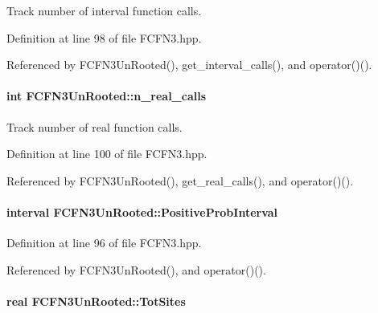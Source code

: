 \-Track number of interval function calls. 



\-Definition at line 98 of file \-F\-C\-F\-N3.\-hpp.



\-Referenced by \-F\-C\-F\-N3\-Un\-Rooted(), get\-\_\-interval\-\_\-calls(), and operator()().

\hypertarget{classFCFN3UnRooted_a69e7833eae34928dfa2c7506238df7ad}{
\paragraph[{n\-\_\-real\-\_\-calls}]{\setlength{\rightskip}{0pt plus 5cm}int {\bf \-F\-C\-F\-N3\-Un\-Rooted\-::n\-\_\-real\-\_\-calls}}}\label{classFCFN3UnRooted_a69e7833eae34928dfa2c7506238df7ad}


\-Track number of real function calls. 



\-Definition at line 100 of file \-F\-C\-F\-N3.\-hpp.



\-Referenced by \-F\-C\-F\-N3\-Un\-Rooted(), get\-\_\-real\-\_\-calls(), and operator()().

\hypertarget{classFCFN3UnRooted_a9afbe62a91bedfa9cde81086b4e5a0de}{
\paragraph[{\-Positive\-Prob\-Interval}]{\setlength{\rightskip}{0pt plus 5cm}interval {\bf \-F\-C\-F\-N3\-Un\-Rooted\-::\-Positive\-Prob\-Interval}}}\label{classFCFN3UnRooted_a9afbe62a91bedfa9cde81086b4e5a0de}


\-Definition at line 96 of file \-F\-C\-F\-N3.\-hpp.



\-Referenced by \-F\-C\-F\-N3\-Un\-Rooted(), and operator()().

\hypertarget{classFCFN3UnRooted_a4492c09788dbf6de2b0e3b37a279ed4c}{
\paragraph[{\-Tot\-Sites}]{\setlength{\rightskip}{0pt plus 5cm}real {\bf \-F\-C\-F\-N3\-Un\-Rooted\-::\-Tot\-Sites}}}\label{classFCFN3UnRooted_a4492c09788dbf6de2b0e3b37a279ed4c}


